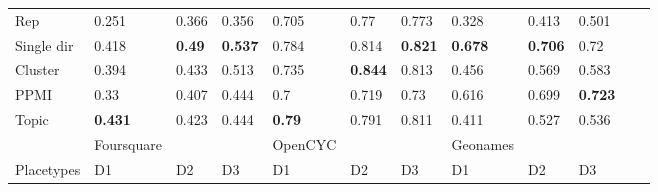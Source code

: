 {\begin{landscape}
\begin{table}[]
\begin{tabular}{llll@{\hskip 0.25in}lll@{\hskip 0.25in}lllll}
			\toprule[\heavyrulewidth]
			Rep               & 0.251                           & 0.366                           & 0.356                           & 0.705                           & 0.77                            & 0.773                           & 0.328                           & 0.413                           & 0.501                           &             &             \\
			Single dir        & 0.418                           & \textbf{0.49}  & \textbf{0.537} & 0.784                           & 0.814                           & \textbf{0.821} & \textbf{0.678} & \textbf{0.706} & 0.72                            &             &             \\
			Cluster           & 0.394                           & 0.433                           & 0.513                           & 0.735                           & \textbf{0.844} & 0.813                           & 0.456                           & 0.569                           & 0.583                           &             &             \\
			PPMI              & 0.33                            & 0.407                           & 0.444                           & 0.7                             & 0.719                           & 0.73                            & 0.616                           & 0.699                           & \textbf{0.723} &             &             \\
			Topic             & \textbf{0.431} & 0.423                           & 0.444                           & \textbf{0.79}  & 0.791                           & 0.811                           & 0.411                           & 0.527                           & 0.536                           &             &             \\
			& Foursquare                      &                                 &                                 & OpenCYC                         &                                 &                                 & Geonames                        &                                 &                                 &             &             \\
			Placetypes        & D1                              & D2                              & D3                              & D1                              & D2                              & D3                              & D1                              & D2                              & D3                              &             &             \\

\end{tabular}
\end{table}
\end{landscape}}
